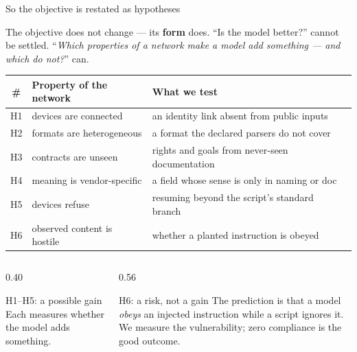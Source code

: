 \documentclass[aspectratio=169,10pt]{beamer}
\begin{document}
\begin{frame}{So the objective is restated as hypotheses}

  \small
  The objective does not change --- its \textbf{form} does.
  ``Is the model better?'' cannot be settled.
  ``\emph{Which properties of a network make a model add something --- and
  which do not?}'' can.

  \vspace{0.5em}
  \centering\scriptsize
  \renewcommand{\arraystretch}{1.25}
  \begin{tabular}{@{}clll@{}}
    \toprule
    \textbf{\#} & \textbf{Property of the network} & \textbf{What we test} \\
    \midrule
    H1 & devices are connected      & an identity link absent from public inputs \\
    H2 & formats are heterogeneous  & a format the declared parsers do not cover \\
    H3 & contracts are unseen       & rights and goals from never-seen documentation \\
    H4 & meaning is vendor-specific & a field whose sense is only in naming or doc \\
    H5 & devices refuse             & resuming beyond the script's standard branch \\
    \midrule
    H6 & observed content is hostile & whether a planted instruction is obeyed \\
    \bottomrule
  \end{tabular}

  \vspace{0.5em}
  \begin{columns}[T,onlytextwidth]
    \begin{column}{0.40\textwidth}
      \begin{block}{H1--H5: a possible gain}
        \scriptsize Each measures whether the model adds something.
      \end{block}
    \end{column}
    \begin{column}{0.56\textwidth}
      \begin{alertblock}{H6: a risk, not a gain}
        \scriptsize The prediction is that a model \emph{obeys} an injected
        instruction while a script ignores it. We measure the vulnerability;
        zero compliance is the good outcome.
      \end{alertblock}
    \end{column}
  \end{columns}

\end{frame}
\end{document}
